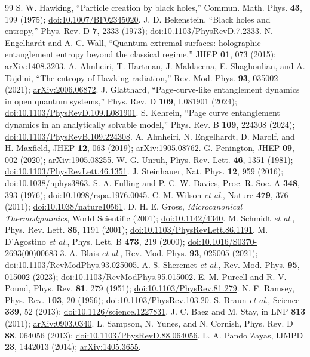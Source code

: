 \documentclass[aps,prx,onecolumn,showpacs,superscriptaddress,longbibliography,nofootinbib]{revtex4-2}
\newcommand{\arxivlink}[1]{\href{https://arxiv.org/abs/#1}{arXiv:#1}}
\newcommand{\doilink}[1]{\href{https://doi.org/#1}{doi:#1}}
\begin{document}
\begin{thebibliography}{99}
 S. W. Hawking, ``Particle creation by black holes,'' Commun. Math. Phys. \textbf{43}, 199 (1975); \doilink{10.1007/BF02345020}.
 J. D. Bekenstein, ``Black holes and entropy,'' Phys. Rev. D \textbf{7}, 2333 (1973); \doilink{10.1103/PhysRevD.7.2333}.
 N. Engelhardt and A. C. Wall, ``Quantum extremal surfaces: holographic entanglement entropy beyond the classical regime,'' JHEP \textbf{01}, 073 (2015); \arxivlink{1408.3203}.
 A. Almheiri, T. Hartman, J. Maldacena, E. Shaghoulian, and A. Tajdini, ``The entropy of Hawking radiation,'' Rev. Mod. Phys. \textbf{93}, 035002 (2021); \arxivlink{2006.06872}.
 J. Glatthard, ``Page-curve-like entanglement dynamics in open quantum systems,'' Phys. Rev. D \textbf{109}, L081901 (2024); \doilink{10.1103/PhysRevD.109.L081901}.
 S. Kehrein, ``Page curve entanglement dynamics in an analytically solvable model,'' Phys. Rev. B \textbf{109}, 224308 (2024); \doilink{10.1103/PhysRevB.109.224308}.
 A. Almheiri, N. Engelhardt, D. Marolf, and H. Maxfield, JHEP \textbf{12}, 063 (2019); \arxivlink{1905.08762}.
 G. Penington, JHEP \textbf{09}, 002 (2020);  \arxivlink{1905.08255}.
 W. G. Unruh, Phys. Rev. Lett. \textbf{46}, 1351 (1981); \doilink{10.1103/PhysRevLett.46.1351}.
 J. Steinhauer, Nat. Phys. \textbf{12}, 959 (2016); \doilink{10.1038/nphys3863}.
 S. A. Fulling and P. C. W. Davies, Proc. R. Soc. A \textbf{348}, 393 (1976); \doilink{10.1098/rspa.1976.0045}.
 C. M. Wilson \emph{et al.}, Nature \textbf{479}, 376 (2011); \doilink{10.1038/nature10561}.
 D. H. E. Gross, \emph{Microcanonical Thermodynamics}, World Scientific (2001); \doilink{10.1142/4340}.
 M. Schmidt \emph{et al.}, Phys. Rev. Lett. \textbf{86}, 1191 (2001); \doilink{10.1103/PhysRevLett.86.1191}.
 M. D'Agostino \emph{et al.}, Phys. Lett. B \textbf{473}, 219 (2000); \doilink{10.1016/S0370-2693(00)00683-3}.
 A. Blais \emph{et al.}, Rev. Mod. Phys. \textbf{93}, 025005 (2021); \doilink{10.1103/RevModPhys.93.025005}.
 A. S. Sheremet \emph{et al.}, Rev. Mod. Phys. \textbf{95}, 015002 (2023); \doilink{10.1103/RevModPhys.95.015002}.
 E. M. Purcell and R. V. Pound, Phys. Rev. \textbf{81}, 279 (1951); \doilink{10.1103/PhysRev.81.279}.
 N. F. Ramsey, Phys. Rev. \textbf{103}, 20 (1956); \doilink{10.1103/PhysRev.103.20}.
 S. Braun \emph{et al.}, Science \textbf{339}, 52 (2013); \doilink{10.1126/science.1227831}.
 J. C. Baez and M. Stay, in LNP \textbf{813} (2011);  \arxivlink{0903.0340}.
 L. Sampson, N. Yunes, and N. Cornish, Phys. Rev. D \textbf{88}, 064056 (2013); \doilink{10.1103/PhysRevD.88.064056}.
 L. A. Pando Zayas, IJMPD \textbf{23}, 1442013 (2014);  \arxivlink{1405.3655}.


\end{thebibliography}
\end{document}
